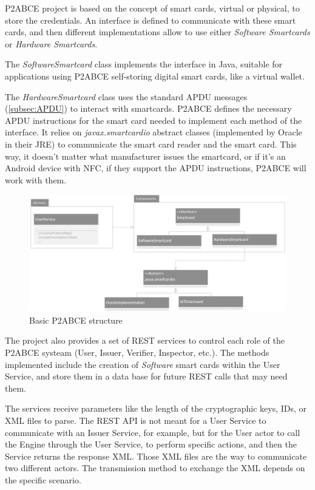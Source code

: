 P2ABCE project is based on the concept of smart cards, virtual or physical, to store the credentials. An interface is defined to communicate with these smart cards, and then different implementations allow to use either \textit{Software Smartcards} or \textit{Hardware Smartcards}. 

The \textit{SoftwareSmartcard} class implements the interface in Java, suitable for applications using P2ABCE self-storing digital smart cards, like a virtual wallet.

The \textit{HardwareSmartcard} class uses the standard APDU messages (\ref{subsec:APDU}) to interact with smartcards. P2ABCE defines the necessary APDU instructions for the smart card needed to implement each method of the interface. It relies on \textit{javax.smartcardio} abstract classes (implemented by Oracle in their JRE) to communicate the smart card reader and the smart card. This way, it doesn't matter what manufacturer issues the smartcard, or if it's an Android device with NFC, if they support the APDU instructions, P2ABCE will work with them.

\begin{figure}[bth]
	\begin{center}
		\includegraphics[width=\linewidth]{gfx/p2abceBasicUML}
	\end{center}
	\caption{Basic P2ABCE structure}
	\label{fig:p2abceBasicUML}
\end{figure}


\hfil

The project also provides a set of REST services to control each role of the P2ABCE systeam (User, Issuer, Verifier, Inspector, etc.). The methods implemented include the creation of \textit{Software} smart cards within the User Service, and store them in a data base for future REST calls that may need them.

The services receive parameters like the length of the cryptographic keys, IDs, or XML files to parse. The REST API is not meant for a User Service to communicate with an Issuer Service, for example, but for the User actor to call the Engine through the User Service, to perform specific actions, and then the Service returns the response XML. Those XML files are the way to communicate two different actors. The transmission method to exchange the XML depends on the specific scenario.



